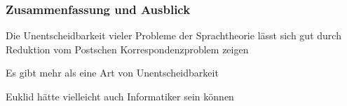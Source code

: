 \documentclass[aspectratio=1610,onlymath]{beamer}
\begin{document}
\begin{frame}\frametitle{Zusammenfassung und Ausblick}

Die Unentscheidbarkeit vieler Probleme der Sprachtheorie lässt sich gut durch Reduktion vom Postschen Korrespondenzproblem zeigen\bigskip

Es gibt mehr als eine Art von Unentscheidbarkeit\bigskip

Euklid hätte vielleicht auch Informatiker sein können\bigskip


\end{frame}

% 
% 
% 
% 
% 
% 
\end{document}
